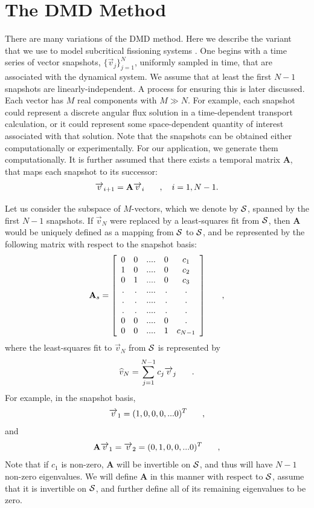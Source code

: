 \documentclass{style/nseJournal}
\newcommand{\bracket}[1]{\left[ #1 \right]}
\renewcommand{\vec}[1]{\overrightarrow{#1}}
\newcommand{\be}{\begin{equation}}
\newcommand{\ee}{\end{equation}}
\newcommand{\pec}{\hspace{0.25in},}
\newcommand{\pep}{\hspace{0.25in}.}
\newcommand{\LEQ}[1]{\label{eq:#1}}
\newcommand{\cS}{{\cal S}}
\newcommand{\mA}{\mathbf{A}}
\begin{document}
\section{The DMD Method}
There are many variations of the DMD method.  
Here we describe the variant that we use to model subcritical fissioning systems \cite{kutz2016dynamic} \cite{schmid2010dynamic}.  
One begins with a time series of vector snapshots, $\{\vec{v}_j\}_{j=1}^{N}$, uniformly sampled in time, that are associated with the dynamical system.  
We assume that at least the first $N-1$ snapshots are linearly-independent.  
A process for ensuring this is later discussed.  
Each vector has $M$ real components with $M \gg N$.  
For example, each snapshot could represent a discrete angular flux solution in a time-dependent transport calculation, or it could represent some space-dependent quantity of interest associated with that solution.  
Note that the snapshots can be obtained either computationally or experimentally.  
For our application, we generate them computationally.  
It is further assumed that there exists a temporal matrix $\mathbf{A}$, that maps each snapshot to its successor:
\be
	\vec{v}_{i+1} = \mA \vec{v}_{i} \pec \quad i=1,N-1.
\LEQ{2.1}
\ee

Let us consider the subspace of $M$-vectors, which we denote by $\cS$, spanned by the first $N-1$ snapshots.  
If $\vec{v}_N$ were replaced by a least-squares fit from $\cS$, then $\mA$ would be uniquely defined as a mapping from $\cS$ to $\cS$, and be represented by the following matrix with respect to the snapshot basis:
\be
	\mA_s = \bracket{
		\begin{array}{ccccccc}
			0 & 0 & ....& 0 & c_1 \\
			1 & 0 & ....& 0 & c_2 \\
			0 & 1 & ....& 0 & c_3 \\
			. & . & ....& . & . \\
			. & . & ....& . & . \\
			. & . & ....& . & . \\
			0 & 0 & ....& 0 & . \\
			0 & 0 & ....& 1 & c_{N-1}
	\end{array}
	} \pec
	\LEQ{2.2}
\ee
where the least-squares fit to $\vec{v}_N$ from $\cS$ is represented by
\be
	\widehat{v}_N = \sum_{j=1}^{N-1} c_j \vec{v}_j \pep
	\LEQ{2.3}
\ee
For example, in the snapshot basis,
\be
	\vec{v}_1 = (1,0,0,0,...0)^T \pec
	\LEQ{2.4}
\ee
and 
\be
	\mA \vec{v}_1 = \vec{v}_2 = (0,1,0,0,...0)^T \pec
	\LEQ{2.5}
\ee
Note that if $c_1$ is non-zero, $\mA$ will be invertible on $\cS$, and thus will have $N-1$ non-zero eigenvalues.  
We will define $\mA$ in this manner with respect to $\cS$, assume that it is invertible on $\cS$, and further define all of its remaining eigenvalues to be zero.  
 
\end{document}
